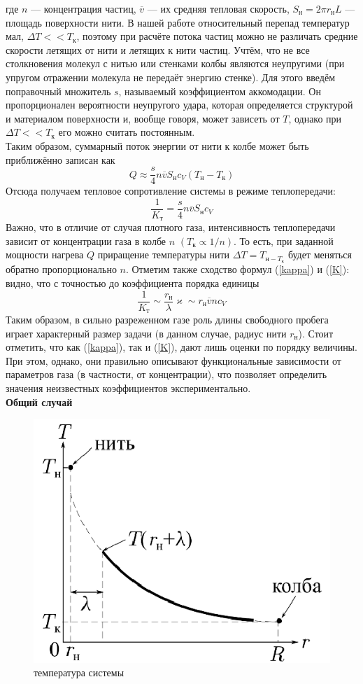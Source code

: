 \documentclass[12pt]{article}
\begin{document}
        где $n$ — концентрация частиц, $\overline{v}$ — их средняя тепловая скорость, $S_\text{н} = 2\pi r_{\text{н}}L$ — площадь поверхности нити.
        В нашей работе относительный перепад температур мал, $\Delta T << T_\text{к}$, поэтому при расчёте потока частиц можно не
        различать средние скорости летящих от нити и летящих к нити частиц. Учтём, что не все столкновения молекул с нитью или
        стенками колбы являются неупругими (при упругом отражении молекула не передаёт энергию
        стенке). Для этого введём поправочный множитель $s$, называемый коэффициентом аккомодации. Он пропорционален вероятности неупругого удара,
        которая определяется структурой и материалом поверхности и, вообще говоря, может зависеть от $T$, однако при $\Delta T << T_{\text{к}}$
        его можно считать постоянным.\\
        Таким образом, суммарный поток энергии от нити к колбе может быть приближённо записан как
        \[
            Q \approx \frac{s}{4} n \overline{v} S_{\text{н}}c_V(T_\text{н}-T_{\text{к}})
        \]
        Отсюда получаем тепловое сопротивление системы в режиме теплопередачи:
        \begin{equation}\label{K}
            \frac{1}{K_{\text{т}}} = \frac{s}{4} n \overline{v} S_{\text{н}}c_V
        \end{equation}
        Важно, что в отличие от случая плотного газа, интенсивность теплопередачи зависит от концентрации газа в колбе $n$ $(T_{\text{к}} \propto 1/n)$. То есть,
        при заданной мощности нагрева $Q$ приращение температуры нити $\Delta T = T_{\text{н}-T_{\text{к}}}$ будет
        меняться обратно пропорционально $n$. Отметим также сходство формул (\ref{kappa}) и (\ref{K}): видно, что с точностью до коэффициента порядка единицы
        \[
            \frac{1}{K_{\text{т}}} \sim \frac{r_{\text{н}}}{\lambda}\varkappa \sim r_{\text{н}}\overline{v}nc_V
        \]
        Таким образом, в сильно разреженном газе роль длины свободного пробега
        играет характерный размер задачи (в данном случае, радиус нити $r_{\text{н}}$). Стоит отметить, что как (\ref{kappa}), так и (\ref{K}), дают лишь оценки по порядку
        величины. При этом, однако, они правильно описывают функциональные зависимости от параметров газа (в частности, от концентрации), что позволяет
        определить значения неизвестных коэффициентов экспериментально.\\
        \textbf{Общий случай}
        \begin{figure}[H]
            \centering
            \includegraphics[width=0.4\linewidth]{system_tempetatute.png}
            \caption{температура системы}
            \label{fig:temp}
        \end{figure}
\end{document}

